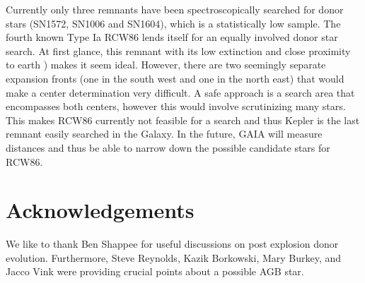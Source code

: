 \documentclass[preprint2]{aastex}
\begin{document}
Currently only three remnants have been spectroscopically searched for donor stars (SN1572, SN1006 and SN1604), which is a statistically low sample. The fourth known Type Ia \snr RCW86 lends itself for an equally involved donor star search. At first glance, this remnant with its low extinction \citep[$A_V \approx 1.7$;][]{1983MNRAS.204..273L} and close proximity to earth \citep[$d=2.5~\kpc$; ][]{2011ApJ...741...96W})  makes it seem ideal. However, there are two seemingly separate expansion fronts (one in the south west and one in the north east) that would make a center determination very difficult. A safe approach is a search area that encompasses both centers, however this would involve scrutinizing many stars. This makes RCW86 currently not feasible for a search and thus Kepler is the last remnant easily searched in the Galaxy. In the future, GAIA will measure distances and thus be able to narrow down the possible candidate stars for RCW86.



\section{Acknowledgements}

We like to thank Ben Shappee for useful discussions on post explosion donor evolution. Furthermore, Steve Reynolds, Kazik Borkowski, Mary Burkey, and Jacco Vink were providing crucial points about a possible AGB star. 



\end{document}
